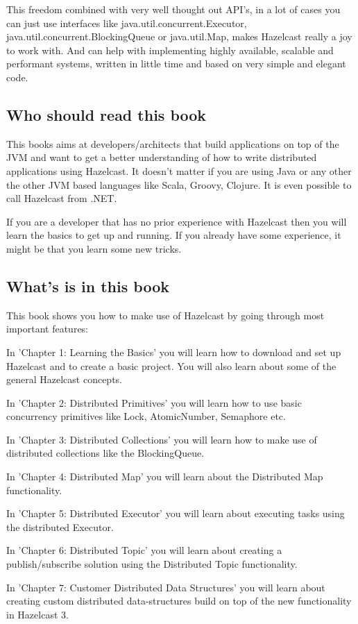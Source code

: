 This freedom combined with very well thought out API's, in a lot of cases you can just use interfaces like java.util.concurrent.Executor, java.util.concurrent.BlockingQueue or java.util.Map, makes Hazelcast really a joy to work with. And can help with implementing highly available, scalable and performant systems, written in little time and based on very simple and elegant code.

\subsection*{Who should read this book}
This books aims at developers/architects that build applications on top of the JVM and want to get a better understanding of how to write distributed applications using Hazelcast. It doesn't matter if you are using Java or any other the other JVM based languages like Scala, Groovy, Clojure. It is even possible to call Hazelcast from .NET.

If you are a developer that has no prior experience with Hazelcast then you will learn the basics to get up and running. If you already have some experience, it might be that you learn some new tricks.
 
\subsection*{What's is in this book}
This book shows you how to make use of Hazelcast by going through most important features:

In 'Chapter 1: Learning the Basics' you will learn how to download and set up Hazelcast and to create a basic project. You will also learn about some of the general Hazelcast concepts.

In 'Chapter 2: Distributed Primitives' you will learn how to use basic concurrency primitives like Lock, AtomicNumber, Semaphore etc.

In 'Chapter 3: Distributed Collections' you will learn how to make use of distributed collections like the BlockingQueue.

In 'Chapter 4: Distributed Map' you will learn about the Distributed Map functionality.

In 'Chapter 5: Distributed Executor' you will learn about executing tasks using the distributed Executor.

In 'Chapter 6: Distributed Topic' you will learn about creating a publish/subscribe solution using the Distributed Topic functionality.

In 'Chapter 7: Customer Distributed Data Structures' you will learn about creating custom distributed data-structures build on top of the new functionality in Hazelcast 3.

